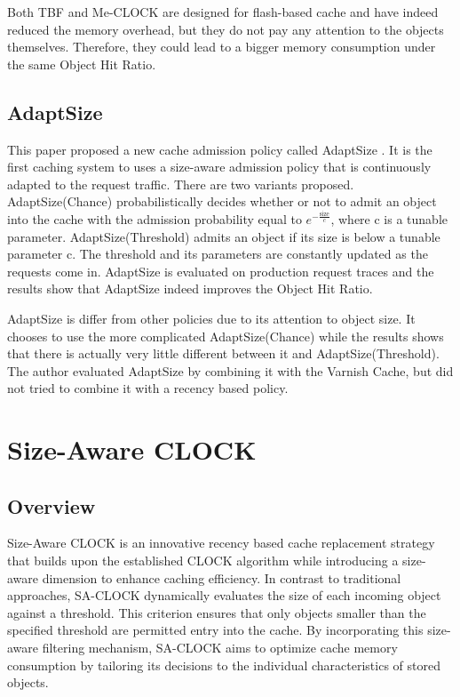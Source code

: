 \documentclass[conference]{IEEEtran}
\begin{document}
Both TBF and Me-CLOCK are designed for flash-based cache and have indeed reduced the memory overhead, but they do not pay any attention to the objects themselves. Therefore, they could lead to a bigger memory consumption under the same Object Hit Ratio.

\subsection{AdaptSize}
This paper proposed a new cache admission policy called AdaptSize \cite{b4}. It is the first caching system to uses a size-aware admission policy that is continuously adapted to the request traffic. There are two variants proposed. AdaptSize(Chance) probabilistically decides whether or not to admit an object into the cache with the admission probability equal to $e^{-\frac{\text{size}}{c}}$, where c is a tunable parameter. AdaptSize(Threshold) admits an object if its size is below a tunable parameter c. The threshold and its parameters are constantly updated as the requests come in. AdaptSize is evaluated on production request traces and the results show that AdaptSize indeed improves the Object Hit Ratio.

AdaptSize is differ from other policies due to its attention to object size. It chooses to use the more complicated AdaptSize(Chance) while the results shows that there is actually very little different between it and AdaptSize(Threshold). The author evaluated AdaptSize by combining it with the Varnish Cache, but did not tried to combine it with a recency based policy.

\section{Size-Aware CLOCK}
\subsection{Overview}
Size-Aware CLOCK is an innovative recency based cache replacement strategy that builds upon the established CLOCK algorithm while introducing a size-aware dimension to enhance caching efficiency. In contrast to traditional approaches, SA-CLOCK dynamically evaluates the size of each incoming object against a threshold. This criterion ensures that only objects smaller than the specified threshold are permitted entry into the cache. By incorporating this size-aware filtering mechanism, SA-CLOCK aims to optimize cache memory consumption by tailoring its decisions to the individual characteristics of stored objects.
\end{document}
